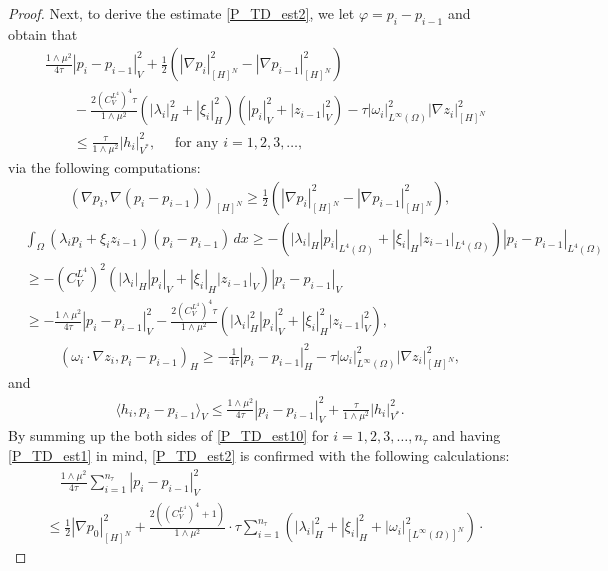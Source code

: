 \documentclass{sinst}
\numberwithin{equation}{section}
\theoremstyle{plain}
\theoremstyle{definition}
\def\dual#1{\langle #1 \rangle}
\begin{document}
\begin{proof}
  Next, to derive the estimate \eqref{P_TD_est2}, we let $\varphi = p_i - p_{i-1}$ and obtain that
  \begin{align}
    &\frac{1 \wedge \mu^2}{4\tau} |p_i - p_{i-1}|_V^2 + \frac{1}{2}(|\nabla p_i|_{[H]^N}^2 - |\nabla p_{i-1}|_{[H]^N}^2) 
    \\
    &\qquad- \frac{2(C_V^{L^4})^4 \tau}{1 \wedge \mu^2}(|\lambda_i|_H^2 + |\xi_i|_H^2)(|p_i|_V^2 + |z_{i-1}|_V^2) - \tau |\omega_i|_{L^\infty(\Omega)}^2 |\nabla z_i|_{[H]^N}^2
    \\
    &\qquad \leq \frac{\tau}{1 \wedge \mu^2} |h_i|_{V^*}^2, \quad \mbox{ for any } i = 1,2,3,\dots, \label{P_TD_est10}
  \end{align}
  via the following computations:
  \begin{gather}
    (\nabla p_i, \nabla(p_i - p_{i-1}))_{[H]^N} \geq \frac{1}{2}(|\nabla p_i|_{[H]^N}^2 - |\nabla p_{i-1}|_{[H]^N}^2),
  \end{gather}
  \begin{align}
    &\int_\Omega (\lambda_i p_i + \xi_i z_{i-1}) (p_i - p_{i-1}) \,dx \geq - (|\lambda_i|_H |p_i|_{L^4(\Omega)} + |\xi_i|_H |z_{i-1}|_{L^4(\Omega)})|p_i - p_{i-1}|_{L^4(\Omega)}
    \\
    &\geq - (C_V^{L^4})^2 (|\lambda_i|_H |p_i|_V + |\xi_i|_H |z_{i-1}|_V)|p_i - p_{i-1}|_V
    \\
    &\geq -\frac{1 \wedge \mu^2}{4\tau}|p_i - p_{i-1}|_V^2 - \frac{2(C_V^{L^4})^4 \tau}{1 \wedge \mu^2} (|\lambda_i|_H^2 |p_i|_V^2 + |\xi_i|_H^2 |z_{i-1}|_V^2),
  \end{align}
  \begin{gather}
    (\omega_i \cdot \nabla z_i, p_i - p_{i-1})_H \geq -\frac{1}{4\tau}|p_i - p_{i-1}|_H^2 - \tau |\omega_i|_{L^\infty(\Omega)}^2 |\nabla z_i|_{[H]^N}^2,
  \end{gather}
  and
  \begin{gather}
    \dual{h_i, p_i - p_{i-1}}_V \leq \frac{1 \wedge \mu^2}{4\tau}|p_i - p_{i-1}|_V^2 + \frac{\tau}{1 \wedge \mu^2} |h_i|_{V^*}^2.
  \end{gather}
  By summing up the both sides of \eqref{P_TD_est10} for $i = 1,2,3,\dots, n_\tau$ and having \eqref{P_TD_est1} in mind, \eqref{P_TD_est2} is confirmed with the following calculations:
  \begin{align}
    &\quad \frac{1 \wedge \mu^2}{4\tau} \sum_{i = 1}^{n_\tau} |p_i - p_{i-1}|_V^2
    \\
    &\leq \frac{1}{2}|\nabla p_0|_{[H]^N}^2 + \frac{2((C_V^{L^4})^4 + 1)}{1 \wedge \mu^2} \cdot \tau\sum_{i=1}^{n_\tau}(|\lambda_i|_H^2 + |\xi_i|_H^2 + |\omega_i|_{[L^\infty(\Omega)]^N}^2) \cdot 

\end{align}
\end{proof}
\end{document}
